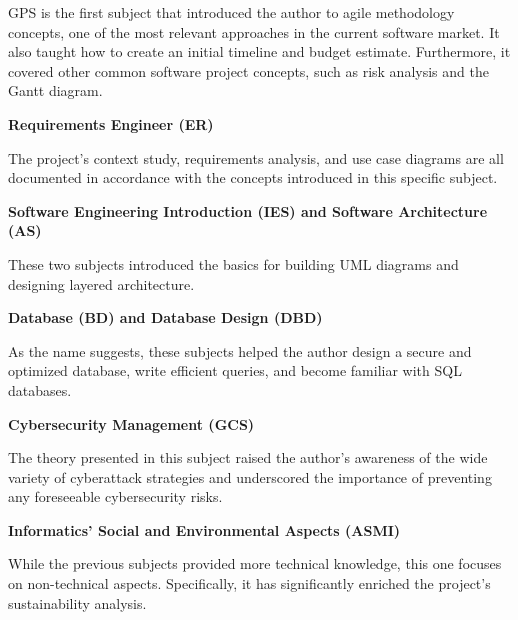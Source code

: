 GPS is the first subject that introduced the author to agile methodology concepts, one of the most relevant approaches in the current software market. It also taught how to create an initial timeline and budget estimate. Furthermore, it covered other common software project concepts, such as risk analysis and the Gantt diagram.

\vspace{0.2cm}
\textbf{Requirements Engineer (ER)}
\vspace{-0.1cm}

The project's context study, requirements analysis, and use case diagrams are all documented in accordance with the concepts introduced in this specific subject.

\vspace{0.2cm}
\textbf{Software Engineering Introduction (IES) and Software Architecture (AS)}
\vspace{-0.1cm}

These two subjects introduced the basics for building UML diagrams and designing layered architecture.

\vspace{0.2cm}
\textbf{Database (BD) and Database Design (DBD)}
\vspace{-0.1cm}

As the name suggests, these subjects helped the author design a secure and optimized database, write efficient queries, and become familiar with SQL databases.

\vspace{0.2cm}
\textbf{Cybersecurity Management (GCS)}
\vspace{-0.1cm}

The theory presented in this subject raised the author's awareness of the wide variety of cyberattack strategies and underscored the importance of preventing any foreseeable cybersecurity risks.

\vspace{0.2cm}
\textbf{Informatics' Social and Environmental Aspects (ASMI)}
\vspace{-0.1cm}

While the previous subjects provided more technical knowledge, this one focuses on non-technical aspects. Specifically, it has significantly enriched the project's sustainability analysis.
